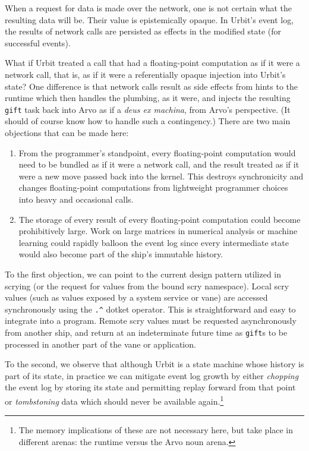 \documentclass[twoside]{article}
\begin{document}
When a request for data is made over the network, one is not certain what the resulting data will be.  Their value is epistemically opaque.  In Urbit's event log, the results of network calls are persisted as effects in the modified state (for successful events).

What if Urbit treated a call that had a floating-point computation as if it were a network call, that is, as if it were a referentially opaque injection into Urbit's state?  One difference is that network calls result as side effects from hints to the runtime which then handles the plumbing, as it were, and injects the resulting \texttt{gift} task back into Arvo as if a \emph{deus ex machina}, from Arvo's perspective.  (It should of course know how to handle such a contingency.)  There are two main objections that can be made here:

\begin{enumerate}
  \item  From the programmer's standpoint, every floating-point computation would need to be bundled as if it were a network call, and the result treated as if it were a new move passed back into the kernel.  This destroys synchronicity and changes floating-point computations from lightweight programmer choices into heavy and occasional calls.

  \item  The storage of every result of every floating-point computation could become prohibitively large.  Work on large matrices in numerical analysis or machine learning could rapidly balloon the event log since every intermediate state would also become part of the ship's immutable history.
\end{enumerate}

To the first objection, we can point to the current design pattern utilized in scrying (or the request for values from the bound scry namespace).  Local scry values (such as values exposed by a system service or vane) are accessed synchronously using the \texttt{\string.\string^} dotket operator.  This is straightforward and easy to integrate into a program.  Remote scry values must be requested asynchronously from another ship, and return at an indeterminate future time as \texttt{gift}s to be processed in another part of the vane or application.

To the second, we observe that although Urbit is a state machine whose history is part of its state, in practice we can mitigate event log growth by either \emph{chopping} the event log by storing its state and permitting replay forward from that point or \emph{tombstoning} data which should never be available again.\footnote{The memory implications of these are not necessary here, but take place in different arenas:  the runtime versus the Arvo noun arena.}
\end{document}
